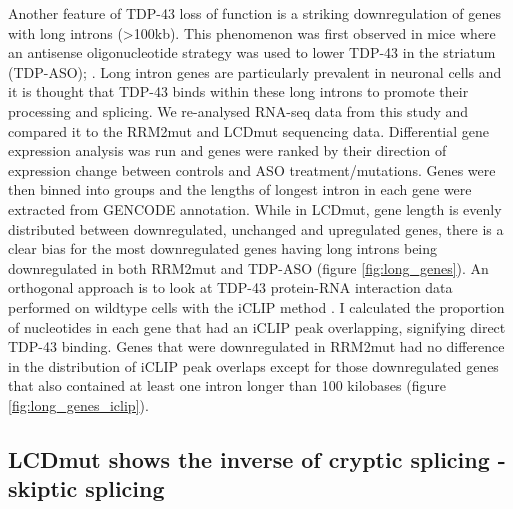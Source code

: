 Another feature of TDP-43 loss of function is a striking downregulation of genes with long introns (>100kb). This phenomenon was first observed in mice where an antisense oligonucleotide strategy was used to lower TDP-43 in the striatum (TDP-ASO); \citep{Polymenidou2011-hs}. Long intron genes are particularly prevalent in neuronal cells and it is thought that TDP-43 binds within these long introns to promote their processing and splicing. We re-analysed RNA-seq data from this study and compared it to the RRM2mut and LCDmut sequencing data. Differential gene expression analysis was run and genes were ranked by their direction of expression change between controls and ASO treatment/mutations. Genes were then binned into groups and the lengths of longest intron in each gene were extracted from GENCODE annotation. While in LCDmut, gene length is evenly distributed between downregulated, unchanged and upregulated genes, there is a clear bias for the most downregulated genes having long introns being downregulated in both RRM2mut and TDP-ASO (figure \ref{fig:long_genes}). 
An orthogonal approach is to look at TDP-43 protein-RNA interaction data performed on wildtype cells with the iCLIP method \citep{Huppertz2014-ip}. I calculated the proportion of nucleotides in each gene that had an iCLIP peak overlapping, signifying direct TDP-43 binding. Genes that were downregulated in RRM2mut had no difference in the distribution of iCLIP peak overlaps except for those downregulated genes that also contained at least one intron longer than 100 kilobases (figure \ref{fig:long_genes_iclip}). 


\subsection{LCDmut shows the inverse of cryptic splicing - skiptic splicing}


